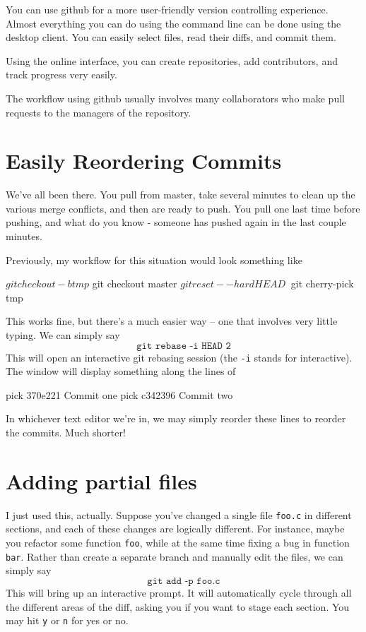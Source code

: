 \documentclass[12pt]{report}
\begin{document}
You can use github for a more user-friendly version controlling experience.  Almost everything you can do using the command line can be done using the desktop client.  You can easily select files, read their diffs, and commit them.
 

Using the online interface, you can create repositories, add contributors, and track progress very easily.

The workflow using github usually involves many collaborators who make pull requests to the managers of the repository.


\section{Easily Reordering Commits}

We've all been there. You pull from master, take several minutes to
clean up the various merge conflicts, and then are ready to push. You
pull one last time before pushing, and what do you know - someone has
pushed again in the last couple minutes.

Previously, my workflow for this situation would look something like
\begin{blockcode}
$ git checkout -b tmp
$ git checkout master
$ git reset --hard HEAD~
$ git cherry-pick tmp
\end{blockcode}

This works fine, but there’s a much easier way -- one that involves
very little typing. We can simply say
\[
  \texttt{git rebase -i HEAD~2}
\]
This will open an interactive git rebasing session (the \texttt{-i}
stands for interactive). The window will display something along the
lines of
\begin{blockcode}
pick 370e221 Commit one
pick c342396 Commit two
\end{blockcode}
In whichever text editor we’re in, we may simply reorder these lines
to reorder the commits. Much shorter!

\section{Adding partial files}
I just used this, actually. Suppose you’ve changed a single file
\texttt{foo.c} in different sections, and each of these changes are
logically different. For instance, maybe you refactor some function
\texttt{foo}, while at the same time fixing a bug in function
\texttt{bar}. Rather than create a separate branch and manually edit
the files, we can simply say
\[
  \texttt{git add -p foo.c}
\]
This will bring up an interactive prompt. It will automatically cycle
through all the different areas of the diff, asking you if you want to
stage each section. You may hit \texttt{y} or \texttt{n} for yes or
no.
\end{document}
